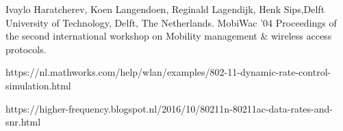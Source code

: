 \documentclass[a4paper, 10pt, conference]{ieeeconf}
\begin{document}
\begin{thebibliography}{99}

 \label{referencepaper}
  	Ivaylo Haratcherev, Koen Langendoen, Reginald Lagendijk, Henk Sips,Delft University of Technology, Delft, The Netherlands. MobiWac '04 Proceedings of the second international workshop on Mobility management \& wireless access protocols.
  	
 \label{matlabcode}
https://nl.mathworks.com/help/wlan/examples/802-11-dynamic-rate-control-simulation.html

 \label{thresholds}
https://higher-frequency.blogspot.nl/2016/10/80211n-80211ac-data-rates-and-snr.html

\end{thebibliography}
\end{document}
